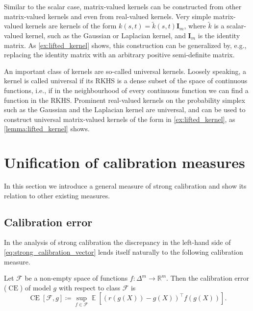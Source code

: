 \documentclass{article}
\DeclareMathOperator{\Expect}{\mathbb{E}}
\DeclareMathOperator{\measure}{CE}
\begin{document}
Similar to the scalar case, matrix-valued kernels can be constructed from other
matrix-valued kernels and even from real-valued kernels. Very simple
matrix-valued kernels are kernels of the form
$k(s,t) = \tilde{k}(s,t) \mathbf{I}_m$, where $\tilde{k}$ is a scalar-valued
kernel, such as the Gaussian or Laplacian kernel, and $\mathbf{I}_m$ is the
identity matrix. As \cref{ex:lifted_kernel} shows, this construction can be
generalized by, e.g., replacing the identity matrix with an arbitrary positive
semi-definite matrix.

An important class of kernels are so-called universal kernels. Loosely speaking,
a kernel is called universal if its RKHS is a dense subset of the space of
continuous functions, i.e., if in the neighbourhood of every continuous function
we can find a function in the RKHS. Prominent real-valued kernels on the
probability simplex such as the Gaussian and the Laplacian kernel are universal,
and can be used to construct universal matrix-valued kernels of the form in
\cref{ex:lifted_kernel}, as \cref{lemma:lifted_kernel} shows.

\section{Unification of calibration measures}

In this section we introduce a general measure of strong calibration and show its
relation to other existing measures.

\subsection{Calibration error}

In the analysis of strong calibration the discrepancy in the left-hand side of
\cref{eq:strong_calibration_vector} lends itself naturally to the following
calibration measure.

\begin{definition}\label{def:ce_supremum}
  Let $\mathcal{F}$ be a non-empty space of functions
  $f \colon \Delta^m \to \mathbb{R}^m$. Then the calibration error ($\measure$)
  of model $g$ with respect to class $\mathcal{F}$ is
  \begin{equation*}
    \measure[\mathcal{F}, g]  \coloneqq \sup_{f \in \mathcal{F}} \Expect\left[{(r(g(X)) - g(X))}^\intercal f(g(X)) \right].
  \end{equation*}
\end{definition}
\end{document}
